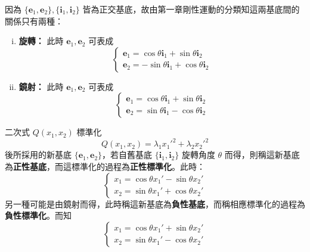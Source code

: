 因為 $\{\mathbf{e}_1, \mathbf{e}_2\}, \{\mathbf{i}_1, \mathbf{i}_2\}$ 皆為正交基底，故由第一章剛性運動的分類知這兩基底間的關係只有兩種：
\begin{enumerate}[(i)]
  \item \textbf{旋轉：} 此時 $\mathbf{e}_1, \mathbf{e}_2$ 可表成
  \begin{equation}
  \begin{cases}
  \mathbf{e}_1 = \cos\theta \mathbf{i}_1 + \sin\theta \mathbf{i}_2 \\
  \mathbf{e}_2 = -\sin\theta \mathbf{i}_1 + \cos\theta \mathbf{i}_2
  \end{cases}
  \label{eq:b4s-ch4-rot-basis}
  \end{equation}
  \item \textbf{鏡射：} 此時 $\mathbf{e}_1, \mathbf{e}_2$ 可表成
  \begin{equation}
  \begin{cases}
  \mathbf{e}_1 = \cos\theta \mathbf{i}_1 + \sin\theta \mathbf{i}_2 \\
  \mathbf{e}_2 = \sin\theta \mathbf{i}_1 - \cos\theta \mathbf{i}_2
  \end{cases}
  \label{eq:b4s-ch4-refl-basis}
  \end{equation}
\end{enumerate}

\begin{definition}
二次式 $Q(x_1, x_2)$ 標準化
\[
Q(x_1, x_2) = \lambda_1 {x_1'}^2 + \lambda_2 {x_2'}^2
\]
後所採用的新基底 $\{\mathbf{e}_1, \mathbf{e}_2\}$，若自舊基底 $\{\mathbf{i}_1, \mathbf{i}_2\}$ 旋轉角度 $\theta$ 而得，則稱這新基底為\textbf{正性基底}，而這標準化的過程為\textbf{正性標準化}。此時：
\begin{equation}
\begin{cases}
x_1 = \cos\theta x_1' - \sin\theta x_2' \\
x_2 = \sin\theta x_1' + \cos\theta x_2'
\end{cases}
\label{eq:b4s-ch4-pos-standard-coord}
\end{equation}
另一種可能是由鏡射而得，此時稱這新基底為\textbf{負性基底}，而稱相應標準化的過程為\textbf{負性標準化}。而知
\begin{equation}
\begin{cases}
x_1 = \cos\theta x_1' + \sin\theta x_2' \\
x_2 = \sin\theta x_1' - \cos\theta x_2'
\end{cases}
\label{eq:b4s-ch4-neg-standard-coord}
\end{equation}
\end{definition}

